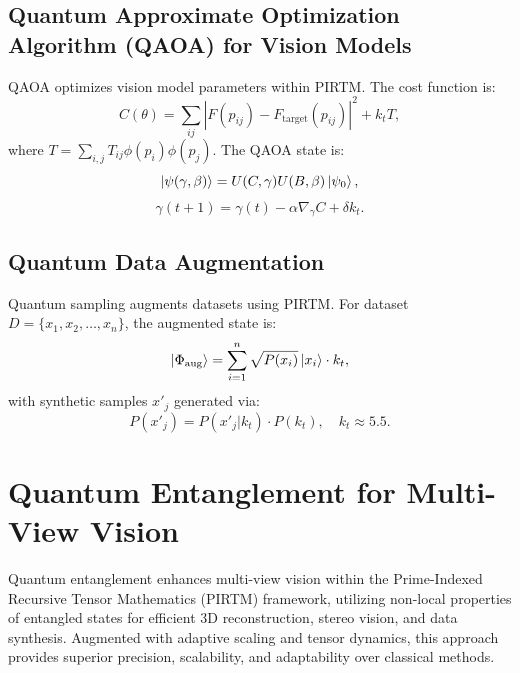 \documentclass{article}
\theoremstyle{plain}
\begin{document}
\subsection{Quantum Approximate Optimization Algorithm (QAOA) for Vision Models}
QAOA optimizes vision model parameters within PIRTM. The cost function is:
\begin{equation}
C(\theta) = \sum_{ij} |F(p_{ij}) - F_\text{target}(p_{ij})|^2 + k_t T,
\end{equation}
where \( T = \sum_{i,j} T_{ij} \phi(p_i) \phi(p_j) \). The QAOA state is:
\begin{equation}
\ket{\psi(\gamma, \beta)} = U(C, \gamma) U(B, \beta) \ket{\psi_0},
\end{equation}
\begin{equation}
\gamma(t+1) = \gamma(t) - \alpha \nabla_\gamma C + \delta k_t.
\end{equation}

\subsection{Quantum Data Augmentation}
Quantum sampling augments datasets using PIRTM. For dataset \( D = \{x_1, x_2, \dots, x_n\} \), the augmented state is:
\begin{equation}
\ket{\Phi_\text{aug}} = \sum_{i=1}^{n} \sqrt{P(x_i)} \ket{x_i} \cdot k_t,
\end{equation}
with synthetic samples \( x'_j \) generated via:
\begin{equation}
P(x'_j) = P(x'_j | k_t) \cdot P(k_t), \quad k_t \approx 5.5.
\end{equation}
\section{Quantum Entanglement for Multi-View Vision}
Quantum entanglement enhances multi-view vision within the Prime-Indexed Recursive Tensor Mathematics (PIRTM) framework, utilizing non-local properties of entangled states for efficient 3D reconstruction, stereo vision, and data synthesis. Augmented with adaptive scaling and tensor dynamics, this approach provides superior precision, scalability, and adaptability over classical methods.
\end{document}
